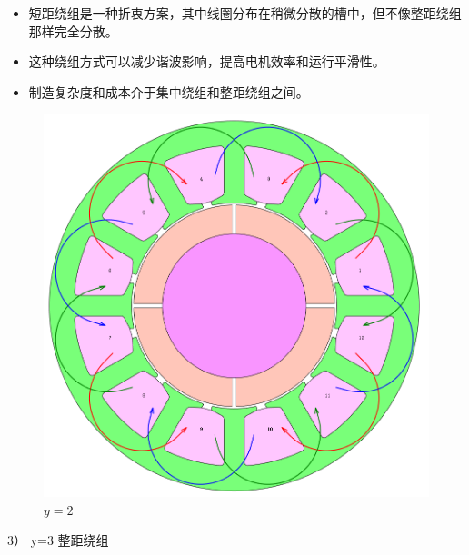 \documentclass{thuemp}
\begin{document}
\begin{itemize}
	\item 短距绕组是一种折衷方案，其中线圈分布在稍微分散的槽中，但不像整距绕组那样完全分散。
	\item 这种绕组方式可以减少谐波影响，提高电机效率和运行平滑性。
	\item 制造复杂度和成本介于集中绕组和整距绕组之间。
\end{itemize}
\begin{figure}[H]
  \centering
  \includegraphics[width=1\linewidth]{./img/task2/model2.png}
  \caption{$y=2$}
\end{figure}

3） y=3 整距绕组
\end{document}
